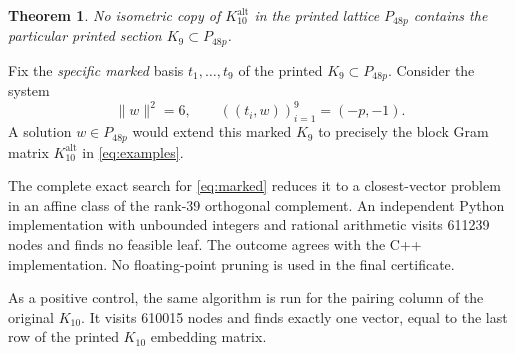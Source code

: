 \documentclass[11pt,a4paper]{article}
\newtheorem{theorem}{Theorem}[section]
\theoremstyle{remark}\newtheorem{remark}[theorem]{Remark}
\newcommand{\Kalt}{K_{10}^{\mathrm{alt}}}
\begin{document}
\begin{theorem}\label{thm:nonembedding}
No isometric copy of $\Kalt$ in the printed lattice $P_{48p}$ contains the particular printed section $K_9\subset P_{48p}$.
\end{theorem}

Fix the \emph{specific marked} basis $t_1,\ldots,t_9$ of the printed $K_9\subset P_{48p}$. Consider the system
\begin{equation}\label{eq:marked}
\|w\|^2=6,\qquad ((t_i,w))_{i=1}^9=(-p,-1).
\end{equation}
A solution $w\in P_{48p}$ would extend this marked $K_9$ to precisely the block Gram matrix $\Kalt$ in \eqref{eq:examples}.

The complete exact search for \eqref{eq:marked} reduces it to a closest-vector problem in an affine class of the rank-39 orthogonal complement. An independent Python implementation with unbounded integers and rational arithmetic visits 611239 nodes and finds no feasible leaf. The outcome agrees with the C++ implementation. No floating-point pruning is used in the final certificate.

As a positive control, the same algorithm is run for the pairing column of the original $K_{10}$. It visits 610015 nodes and finds exactly one vector, equal to the last row of the printed $K_{10}$ embedding matrix.
\end{document}
